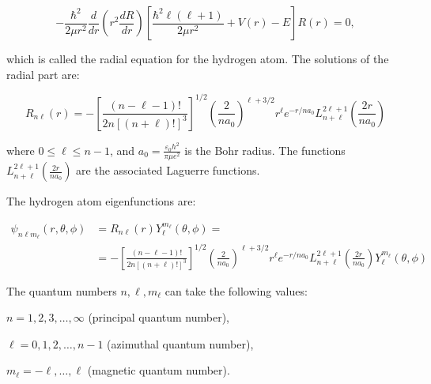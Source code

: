 \documentclass[
  9pt,
]{extbook}
\theoremstyle{definition}
\theoremstyle{definition}
\theoremstyle{definition}
\theoremstyle{remark}
\begin{document}
\begin{equation}
- \frac{\hbar^2}{2 \mu r^2} \frac{d}{dr} \left( r^2 \frac{dR}{dr}
\right) \left[\frac{\hbar^2 \ell(\ell+1)}{2 \mu r^2} + V(r) - E \right] R(r) = 0,
\label{eq:HA4}
\end{equation}

which is called the radial equation for the hydrogen atom. The solutions of the radial part are:

\begin{equation}
R_{n\ell}(r) = - \left[ \frac{(n - \ell - 1)!}{2n[(n+\ell)!]^3} \right]^{1/2}\left(\frac{2}{na_0}\right)^{\ell+3/2}r^{\ell} e^{-r/na_0} L_{n+\ell}^{2\ell+1}
\left( \frac{2r}{n a_0} \right)
\label{eq:HA5}
\end{equation}

where \(0 \leq \ell \leq n - 1\), and \(a_0 = \frac{\varepsilon_0 h^2}{\pi \mu e^2}\) is the Bohr radius. The functions \(L_{n+\ell}^{2\ell+1}\left(\frac{2r}{na_0}\right)\) are the associated Laguerre functions.

The hydrogen atom eigenfunctions are:

\begin{equation}
\begin{aligned}
\psi_{n\ell m_{\ell}}(r,\theta,\phi) &= R_{n\ell}(r)Y_{\ell}^{m_{\ell}}(\theta,\phi) = \\
&= - \left[ \frac{(n - \ell - 1)!}{2n[(n+\ell)!]^3} \right]^{1/2}\left(\frac{2}{na_0}\right)^{\ell+3/2}r^{\ell} e^{-r/na_0} L_{n+\ell}^{2\ell+1}
\left( \frac{2r}{n a_0} \right) Y_{\ell}^{m_{\ell}}(\theta,\phi)
\end{aligned}
\label{eq:HA6}
\end{equation}

The quantum numbers \(n,\ell,m_{\ell}\) can take the following values:

\(n=1,2,3,\ldots,\infty\) (principal quantum number),

\(\ell =0,1,2,\ldots ,n-1\) (azimuthal quantum number),

\(m_{\ell}=-\ell ,\ldots ,\ell\) (magnetic quantum number).
\end{document}
